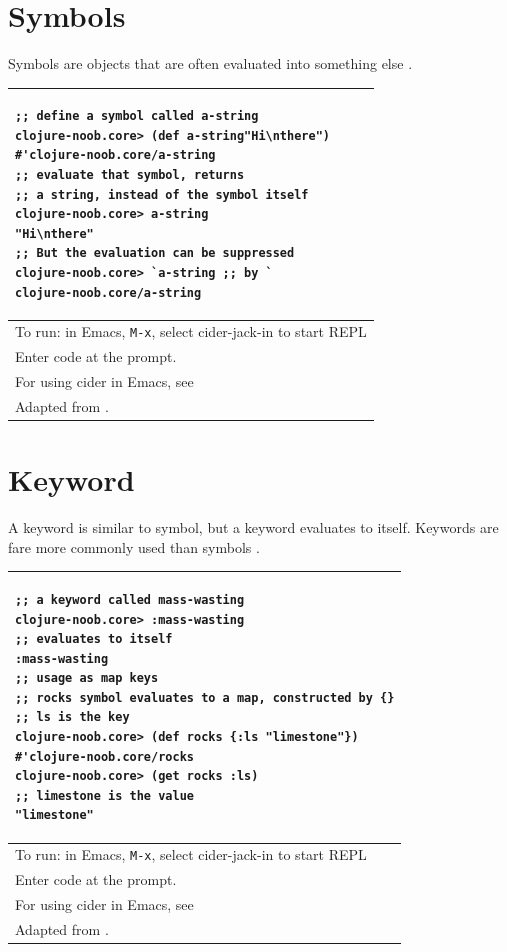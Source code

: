 \documentclass[12pt]{article}
\begin{document}
\part{Symbols}
Symbols are objects that are often evaluated into something else \cite{fogus2014joy}.

\begin{tabular}{|p{}|}
\hline
\begin{verbatim}
;; define a symbol called a-string
clojure-noob.core> (def a-string"Hi\nthere")
#'clojure-noob.core/a-string
;; evaluate that symbol, returns 
;; a string, instead of the symbol itself
clojure-noob.core> a-string
"Hi\nthere"
;; But the evaluation can be suppressed
clojure-noob.core> `a-string ;; by ` 
clojure-noob.core/a-string
\end{verbatim}
\\
\hline
To run: in Emacs, \texttt{M-x}, select cider-jack-in to start REPL\\
Enter code at the prompt.\\
For using cider in Emacs, see \cite{brave2015}\\
\hline
Adapted from \cite{fogus2014joy}.\\
\hline
\end{tabular}

\part{Keyword}

A keyword is similar to symbol, but a keyword evaluates to itself. Keywords are fare more commonly used than symbols \cite{fogus2014joy}.


\begin{tabular}{|p{}|}
\hline
\begin{verbatim}
;; a keyword called mass-wasting
clojure-noob.core> :mass-wasting
;; evaluates to itself
:mass-wasting
;; usage as map keys
;; rocks symbol evaluates to a map, constructed by {}
;; ls is the key
clojure-noob.core> (def rocks {:ls "limestone"})
#'clojure-noob.core/rocks
clojure-noob.core> (get rocks :ls)
;; limestone is the value
"limestone"
\end{verbatim}
\\
\hline
To run: in Emacs, \texttt{M-x}, select cider-jack-in to start REPL\\
Enter code at the prompt.\\
For using cider in Emacs, see \cite{brave2015}\\
\hline
Adapted from \cite{fogus2014joy}.\\
\hline
\end{tabular}
\end{document}
